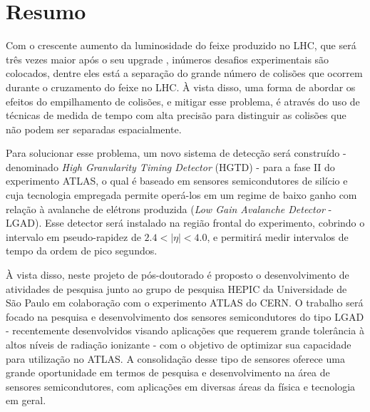 \chapter*{Resumo}


Com o crescente aumento da luminosidade do feixe produzido no LHC, que será três vezes maior após o seu upgrade \cite{tdr}, inúmeros desafios experimentais são colocados, dentre eles está a separação do grande número de colisões que ocorrem durante o cruzamento do feixe no LHC. À vista disso, uma forma de abordar os efeitos do empilhamento de colisões, e mitigar esse problema, é através do uso de técnicas de medida de tempo com alta precisão para distinguir as colisões que não podem ser separadas espacialmente. 

Para solucionar esse problema, um novo sistema de detecção será construído - denominado {\it High Granularity Timing Detector} (HGTD) - para a fase II do experimento ATLAS, o qual é baseado em sensores semicondutores de silício e cuja tecnologia empregada permite operá-los em um regime de baixo ganho com relação à avalanche de elétrons produzida ({\it Low Gain Avalanche Detector} - LGAD). Esse detector será instalado na região frontal do experimento, cobrindo o intervalo em pseudo-rapidez de $2.4< |\eta| <4.0$, e permitirá medir intervalos de tempo da ordem de pico segundos.


À vista disso, neste projeto de pós-doutorado é proposto o desenvolvimento de atividades de pesquisa junto ao grupo de pesquisa HEPIC da Universidade de São Paulo em colaboração com o experimento ATLAS do CERN. O trabalho será focado na pesquisa e desenvolvimento dos sensores semicondutores do tipo LGAD - recentemente desenvolvidos visando aplicações que requerem grande tolerância à altos níveis de radiação ionizante \cite{JIN_LGAD,NIMA_LGAD} - com o objetivo de optimizar sua capacidade para utilização no ATLAS. A consolidação desse tipo de sensores oferece uma grande oportunidade em termos de pesquisa e desenvolvimento na área de sensores semicondutores, com aplicações em diversas áreas da física e tecnologia em geral.

